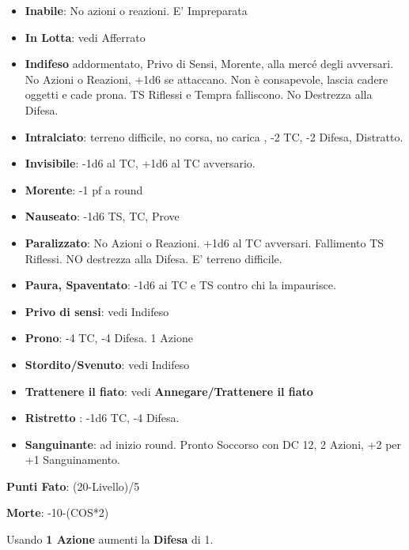 \documentclass[landscape,10pt,a4paper]{article}
\begin{document}
\begin{multicols}{3}
\begin{dmbox}[title=Condizioni]
\begin{itemize}[leftmargin=0.5cm,itemsep=-1pt,parsep=0pt]
	\item \textbf{Inabile}: No azioni o reazioni. E' Impreparata
	\item \textbf{In Lotta}: vedi Afferrato
		\item \textbf{Indifeso} addormentato, Privo di Sensi, Morente, alla mercé degli avversari. No Azioni o Reazioni, +1d6 se attaccano. Non è consapevole, lascia cadere oggetti e cade prona. TS Riflessi e Tempra falliscono. No Destrezza alla Difesa.
		\item \textbf{Intralciato}: terreno difficile, no corsa, no carica , -2 TC, -2 Difesa, Distratto.
		\item \textbf{Invisibile}: -1d6 al TC, +1d6 al TC avversario.
		\item \textbf{Morente}: -1 pf a round
		\item \textbf{Nauseato}: -1d6 TS, TC, Prove
		\item \textbf{Paralizzato}: No Azioni o Reazioni. +1d6 al TC avversari. Fallimento TS Riflessi. NO destrezza alla Difesa. E' terreno difficile.
		\item \textbf{Paura, Spaventato}: -1d6 ai TC e TS contro chi la impaurisce.
		\item \textbf{Privo di sensi}: vedi Indifeso
		\item \textbf{Prono}: -4 TC, -4 Difesa. 1 Azione
		\item \textbf{Stordito/Svenuto}: vedi Indifeso
		\item \textbf{Trattenere il fiato}: vedi \textbf{Annegare/Trattenere il fiato}
		\item \textbf{Ristretto} : -1d6 TC, -4 Difesa.
		\item \textbf{Sanguinante}: ad inizio round. Pronto Soccorso con DC 12, 2 Azioni, +2 per +1 Sanguinamento.
	
	\end{itemize}

\end{dmbox}
		
\begin{mybluebox}\textbf{Punti Fato}: (20-Livello)/5\end{mybluebox}
	
\begin{mybluebox}\textbf{Morte}: -10-(COS*2)\end{mybluebox}	

\begin{dmbox}[title=Preparare la Difesa]	
	
	Usando \textbf{1 Azione} aumenti la \textbf{Difesa} di 1.
	

\end{dmbox}
\end{multicols}
\end{document}
